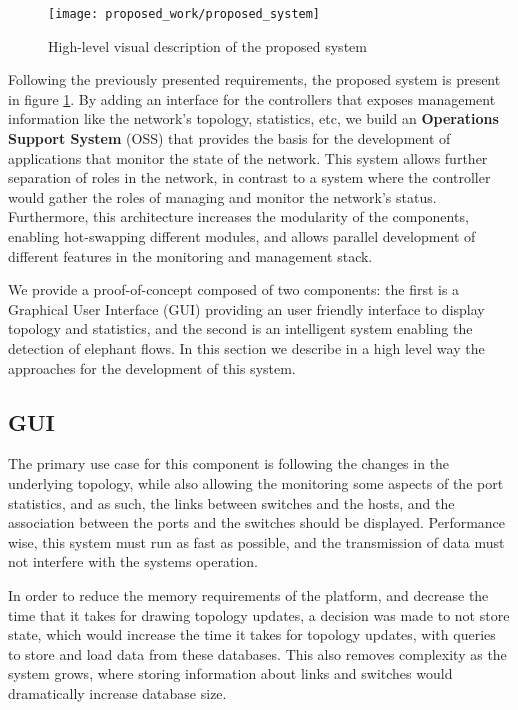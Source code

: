 \begin{figure} [h]
    \centering
    \texttt{[image: proposed\_work/proposed\_system]}
    \caption{High-level visual description of the proposed system} \label{fig:pro_sys}
\end{figure}

\par Following the previously presented requirements, the proposed system is present in figure \ref{fig:pro_sys}. By adding an interface for the controllers that 
exposes management information like the network's topology, statistics, etc, we build an \textbf{Operations Support System} (OSS) that provides the basis 
for the development of applications that monitor the state of the network. This system allows further separation of roles in the network, in contrast to a system 
where the controller would gather the roles of managing and monitor the network's status. Furthermore, this architecture increases the modularity of the components, 
enabling hot-swapping different modules, and allows parallel development of different features in the monitoring and management stack.

\par We provide a proof-of-concept composed of two components: the first is a Graphical User Interface (GUI) providing an user friendly interface to display 
topology and statistics, and the second is an intelligent system enabling the detection of elephant flows. In this section we describe in a high level way the 
approaches for the development of this system.

\subsection {GUI}

The primary use case for this component is following the changes in the underlying topology, while also allowing the monitoring some aspects of the port statistics,
and as such, the links between switches and the hosts, and the association between the ports and the switches should be displayed. Performance wise, this system must
run as fast as possible, and the transmission of data must not interfere with the systems operation. 

\par In order to reduce the memory requirements of the platform, and decrease the time that it takes for drawing topology updates, a decision was made to not store 
state, which would increase the time it takes for topology updates, with queries to store and load data from these databases. This also removes complexity as the 
system grows, where storing information about links and switches would dramatically increase database size.

